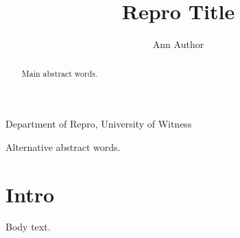 \documentclass{smfart}
\title{Repro Title}\author{Ann Author}
\begin{document}
\begin{abstract}Main abstract words.\end{abstract}
\maketitle
\begin{center}Department of Repro, University of Witness\end{center}
\begin{altabstract}Alternative abstract words.\end{altabstract}
\section{Intro}Body text.
\end{document}
